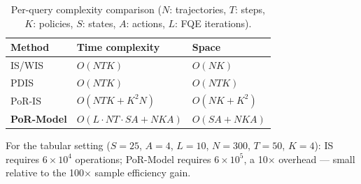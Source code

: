 \documentclass[10pt]{article}
\theoremstyle{plain}
\theoremstyle{definition}
\theoremstyle{remark}
\begin{document}
\begin{table}[h]
  \centering\small
  \caption{Per-query complexity comparison ($N$: trajectories, $T$: steps,
    $K$: policies, $S$: states, $A$: actions, $L$: FQE iterations).}
  \label{tab:complexity}
  \begin{tabular}{lll}
    \toprule
    Method & Time complexity & Space \\
    \midrule
    IS/WIS & $O(NTK)$ & $O(NK)$ \\
    PDIS   & $O(NTK)$ & $O(NTK)$ \\
    PoR-IS & $O(NTK + K^2N)$ & $O(NK + K^2)$ \\
    \textbf{PoR-Model} & $O(L\cdot NT\cdot SA + NKA)$ & $O(SA + NKA)$ \\
    \bottomrule
  \end{tabular}
\end{table}

For the tabular setting ($S=25$, $A=4$, $L=10$, $N=300$, $T=50$, $K=4$):
IS requires $6{\times}10^4$ operations; PoR-Model requires $6{\times}10^5$,
a 10$\times$ overhead --- small relative to the 100$\times$ sample
efficiency gain.
\end{document}

